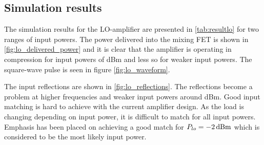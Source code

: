 		\subsection{Simulation results}

			The simulation results for the LO-amplifier are presented in \autoref{tab:resultlo} for two ranges of input powers. The power delivered into the mixing FET is shown in \autoref{fig:lo_delivered_power} and it is clear that the amplifier is operating in compression for input powers of \unit[-2--0]{dBm} and less so for weaker input powers. The square-wave pulse is seen in figure \autoref{fig:lo_waveform}.

			The input reflections are shown in \autoref{fig:lo_reflections}. The reflections become a problem at higher frequencies and weaker input powers around \unit[-4]{dBm}. Good input matching is hard to achieve with the current amplifier design. As the load is changing depending on input power, it is difficult to match for all input powers. Emphasis has been placed on achieving a good match for $P_{lo}=\unit[-2]{dBm}$ which is considered to be the most likely input power.




